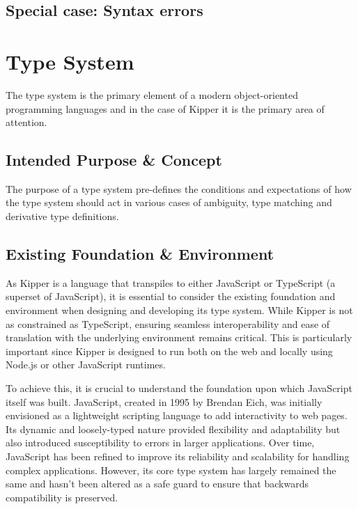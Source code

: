 \subsection{Special case: Syntax errors}

\section{Type System}

The type system is the primary element of a modern object-oriented programming languages and in the case of Kipper it is the primary area of attention.

\subsection{Intended Purpose \& Concept}

The purpose of a type system pre-defines the conditions and expectations of how the type system should act in various cases of ambiguity, type matching and derivative type definitions.

\subsection{Existing Foundation \& Environment}

As Kipper is a language that transpiles to either JavaScript or TypeScript (a superset of JavaScript), it is essential to consider the existing foundation and environment when designing and developing its type system. While Kipper is not as constrained as TypeScript, ensuring seamless interoperability and ease of translation with the underlying environment remains critical. This is particularly important since Kipper is designed to run both on the web and locally using Node.js or other JavaScript runtimes.

To achieve this, it is crucial to understand the foundation upon which JavaScript itself was built. JavaScript, created in 1995 by Brendan Eich, was initially envisioned as a lightweight scripting language to add interactivity to web pages. Its dynamic and loosely-typed nature provided flexibility and adaptability but also introduced susceptibility to errors in larger applications. Over time, JavaScript has been refined to improve its reliability and scalability for handling complex applications. However, its core type system has largely remained the same and hasn't been altered as a safe guard to ensure that backwards compatibility is preserved.

